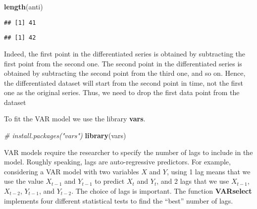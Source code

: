 \documentclass[
]{article}
\newenvironment{Shaded}{\begin{snugshade}}{\end{snugshade}}
\newcommand{\CommentTok}[1]{\textcolor[rgb]{0.56,0.35,0.01}{\textit{#1}}}
\newcommand{\DecValTok}[1]{\textcolor[rgb]{0.00,0.00,0.81}{#1}}
\newcommand{\FunctionTok}[1]{\textcolor[rgb]{0.13,0.29,0.53}{\textbf{#1}}}
\newcommand{\NormalTok}[1]{#1}
\newcommand{\OtherTok}[1]{\textcolor[rgb]{0.56,0.35,0.01}{#1}}
\newcommand{\SpecialCharTok}[1]{\textcolor[rgb]{0.81,0.36,0.00}{\textbf{#1}}}
\begin{document}
\begin{Shaded}
\begin{Highlighting}[]
\FunctionTok{length}\NormalTok{(anti)}
\end{Highlighting}
\end{Shaded}

\begin{verbatim}
## [1] 41
\end{verbatim}

\begin{Shaded}
\end{Shaded}

\begin{verbatim}
## [1] 42
\end{verbatim}

Indeed, the first point in the differentiated series is obtained by subtracting the first point from the second one. The second point in the differentiated series is obtained by subtracting the second point from the third one, and so on. Hence, the differentiated dataset will start from the second point in time, not the first one as the original series. Thus, we need to drop the first data point from the dataset

\begin{Shaded}
\end{Shaded}

To fit the VAR model we use the library \textbf{vars}.

\begin{Shaded}
\begin{Highlighting}[]
\CommentTok{\# install.packages("vars")}
\FunctionTok{library}\NormalTok{(vars)}
\end{Highlighting}
\end{Shaded}

VAR models require the researcher to specify the number of lags to include in the model. Roughly speaking, lags are auto-regressive predictors. For example, considering a VAR model with two variables \(X\) and \(Y\), using 1 lag means that we use the value \(X_{t-1}\) and \(Y_{t-1}\) to predict \(X_t\) and \(Y_t\), and 2 lags that we use \(X_{t-1}\), \(X_{t-2}\), \(Y_{t-1}\), and \(Y_{t-2}\). The choice of lags is important. The function \textbf{VARselect} implements four different statistical tests to find the ``best'' number of lags.
\end{document}
